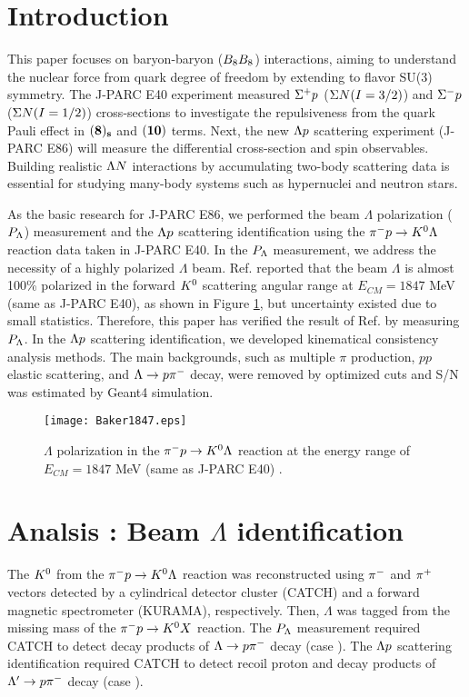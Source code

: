 \documentclass[a4paper,11pt,twoside,twocolumn]{article}
\begin{document}
\section{Introduction}
\label{sec-intro}

This paper focuses on baryon-baryon ($B_{8}B_{8}$) interactions, aiming to understand the nuclear force from quark degree of freedom by extending to flavor SU(3) symmetry. The J-PARC E40 experiment measured $\Sigma^{+}p$ ($\Sigma N (I=3/2)$) and $\Sigma^{-}p$ ($\Sigma N (I=1/2)$) cross-sections to investigate the repulsiveness from the quark Pauli effect in ${\bf(8)_s}$ and ${\bf(10)}$ terms. Next, the new $\Lambda p$ scattering experiment (J-PARC E86) will measure the differential cross-section and spin observables. Building realistic $\Lambda N$ interactions by accumulating two-body scattering data is essential for studying many-body systems such as hypernuclei and neutron stars.

As the basic research for J-PARC E86, we performed the beam $\Lambda$ polarization ($P_{\Lambda}$) measurement and the $\Lambda p$ scattering identification using the $\pi^- p \to K^0 \Lambda$ reaction data taken in J-PARC E40. In the $P_{\Lambda}$ measurement, we address the necessity of a highly polarized $\Lambda$ beam. Ref. \cite{Baker} reported that the beam $\Lambda$ is almost 100\% polarized in the forward $K^{0}$ scattering angular range at $E_{CM}=1847$ MeV (same as J-PARC E40), as shown in Figure \ref{fig-Baker1847}, but uncertainty existed due to small statistics. Therefore, this paper has verified the result of Ref. \cite{Baker} by measuring $P_{\Lambda}$. In the $\Lambda p$ scattering identification, we developed kinematical consistency analysis methods. The main backgrounds, such as multiple $\pi$ production, $pp$ elastic scattering, and $\Lambda\to p\pi^{-}$ decay, were removed by optimized cuts and S/N was estimated by Geant4 simulation. 

\begin{figure}[h]
  \centering
  \texttt{[image: Baker1847.eps]}
  \caption{$\Lambda$ polarization in the $\pi^- p \to K^0 \Lambda$ reaction at the energy range of $E_{CM}=1847$ MeV (same as J-PARC E40) \cite{Baker}.}
  \label{fig-Baker1847}
\end{figure}

\section{Analsis : Beam $\Lambda$ identification}
\label{sec-LbeamID}

The $K^{0}$ from the $\pi^- p \to K^0 \Lambda$ reaction was reconstructed using $\pi^{-}$ and $\pi^{+}$ vectors detected by a cylindrical detector cluster (CATCH) and a forward magnetic spectrometer (KURAMA), respectively. Then, $\Lambda$ was tagged from the missing mass of the $\pi^- p \to K^0 X$ reaction. The $P_{\Lambda}$ measurement required CATCH to detect decay products of $\Lambda\to p\pi^{-}$ decay (case ). The $\Lambda p$ scattering identification required CATCH to detect recoil proton and decay products of $\Lambda'\to p\pi^{-}$ decay (case ).
\end{document}
